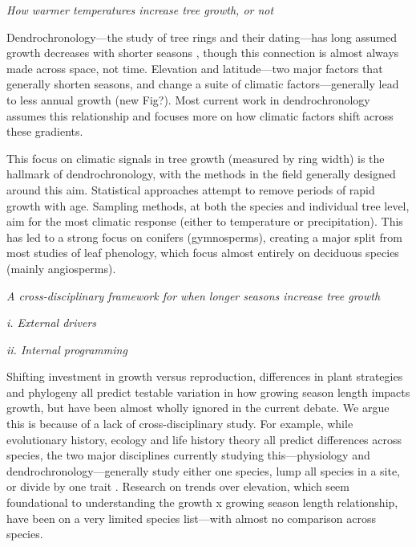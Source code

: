\documentclass[11pt]{article}
\begin{document}

\emph{How warmer temperatures increase tree growth, or not}



Dendrochronology---the study of tree rings and their dating---has long assumed growth decreases with shorter seasons \citep[e.g.,][]{bruening2017}, though this connection is almost always made across space, not time. Elevation and latitude---two major factors that generally shorten seasons, and change a suite of climatic factors---generally lead to less annual growth (new Fig?). Most current work in dendrochronology assumes this relationship and focuses more on how climatic factors shift across these gradients. 

This focus on climatic signals in tree growth (measured by ring width) is the hallmark of dendrochronology, with the methods in the field generally designed around this aim. Statistical approaches attempt to remove periods of rapid growth with age. Sampling methods, at both the species and individual tree level, aim for the most climatic response (either to temperature or precipitation). This has led to a strong focus on conifers (gymnosperms), creating a major split from most studies of leaf phenology, which focus almost entirely on deciduous species (mainly angiosperms).



\emph{A cross-disciplinary framework for when longer seasons increase tree growth}


\emph{i. External drivers}

\emph{ii. Internal programming}





Shifting investment in growth versus reproduction, differences in plant strategies and phylogeny all predict testable variation in how growing season length impacts growth, but have been almost wholly ignored in the current debate. We argue this is because of a lack of cross-disciplinary study. For example, while evolutionary history, ecology and life history theory all predict differences across species, the two major disciplines currently studying this---physiology and dendrochronology---generally study either one species, lump all species in a site, or divide by one trait \citep[e.g.,][]{dow2022warm}. Research on trends over elevation, which seem foundational to understanding the growth x growing season length relationship, have been on a very limited species list---with almost no comparison across species. %
\end{document}
